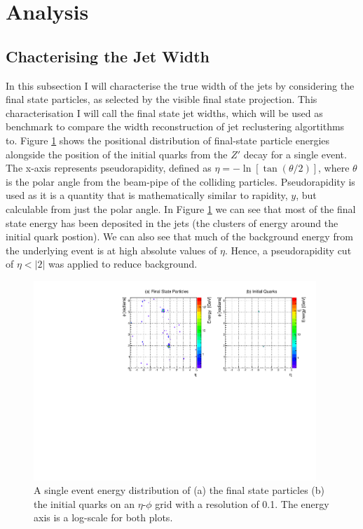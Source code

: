\documentclass[a4paper,11pt, onecolumn]{article}
\begin{document}
  \newpage


\section{Analysis}
\subsection{Chacterising the Jet Width} \label{ss fs}
  
  In this subsection I will characterise the true width of the jets by considering the final state particles, as selected by the visible final
  state projection. This characterisation I will call the final state jet widths, which will be used as benchmark to compare the width reconstruction of
  jet reclustering algortithms to.
  Figure \ref{detector_quark} shows the positional distribution of final-state particle energies alongside the position of the
  initial quarks from the $Z'$ decay for a single event. The x-axis represents pseudorapidity, defined as 
  $\eta = -\ln\left[\tan\left(\theta /2 \right)\right]$, where $\theta$ is the polar angle from the beam-pipe of the colliding particles. Pseudorapidity is used as it is a
  quantity that is mathematically similar to rapidity, $y$, but calculable from just the polar angle. In Figure \ref{detector_quark} 
  we can see that most of the final state energy has been deposited in the jets (the clusters of energy around the initial quark postion). We can also see that much 
  of the background energy from the underlying event is at high absolute values of $\eta$. Hence, a pseudorapidity cut of $\eta < |2|$ was applied to reduce background. \\

  \vspace{-0.15cm}
  \begin{figure}[h]
    \begin{center}
      \includegraphics[width = 0.95\textwidth]{detector_quark}
      \caption{A single event energy distribution of (a) the final state particles (b) the initial quarks on an $\eta$-$\phi$ grid
           with a resolution of 0.1. The energy axis is a log-scale for both plots.}
      \label{detector_quark}
    \end{center}
  \end{figure}
\end{document}
